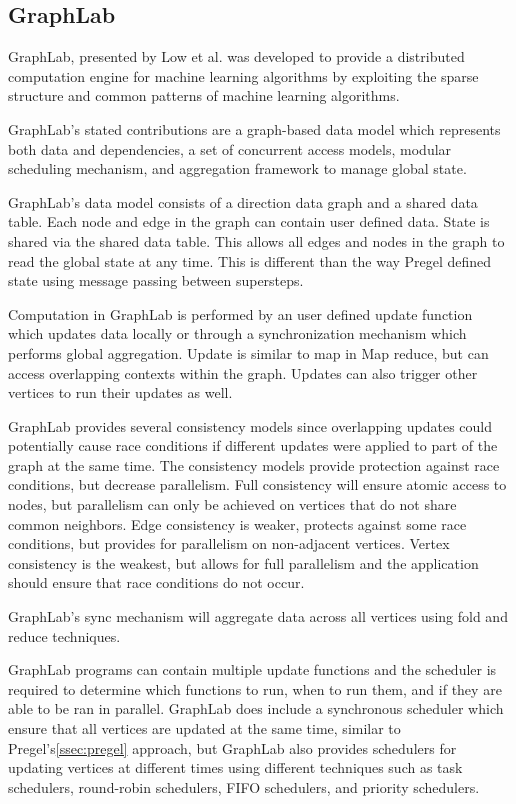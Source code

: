 \documentclass[]{article}
\begin{document}
\subsection{GraphLab}\label{ssec:graphlab}
GraphLab, presented by Low et al.\cite{low2012distributed} was developed to provide a distributed computation engine for machine learning algorithms by exploiting the sparse structure and common patterns of machine learning algorithms. 

GraphLab's stated contributions are a graph-based data model which represents both data and dependencies, a set of concurrent access models, modular scheduling mechanism, and aggregation framework to manage global state.

GraphLab's data model consists of a direction data graph and a shared data table. Each node and edge in the graph can contain user defined data. State is shared via the shared data table. This allows all edges and nodes in the graph to read the global state at any time. This is different than the way Pregel defined state using message passing between supersteps.

Computation in GraphLab is performed by an user defined update function which updates data locally or through a synchronization mechanism which performs global aggregation. Update is similar to map in Map reduce, but can access overlapping contexts within the graph. Updates can also trigger other vertices to run their updates as well. 

GraphLab provides several consistency models since overlapping updates could potentially cause race conditions if different updates were applied to part of the graph at the same time. The consistency models provide protection against race conditions, but decrease parallelism. Full consistency will ensure atomic access to nodes, but parallelism can only be achieved on vertices that do not share common neighbors. Edge consistency is weaker, protects against some race conditions, but provides for parallelism on non-adjacent vertices. Vertex consistency is the weakest, but allows for full parallelism and the application should ensure that race conditions do not occur.

GraphLab's sync mechanism will aggregate data across all vertices using fold and reduce techniques. 

GraphLab programs can contain multiple update functions and the scheduler is required to determine which functions to run, when to run them, and if they are able to be ran in parallel. GraphLab does include a synchronous scheduler which ensure that all vertices are updated at the same time, similar to Pregel's\ref{ssec:pregel} approach, but GraphLab also provides schedulers for updating vertices at different times using different techniques such as task schedulers, round-robin schedulers, FIFO schedulers, and priority schedulers.
\end{document}
